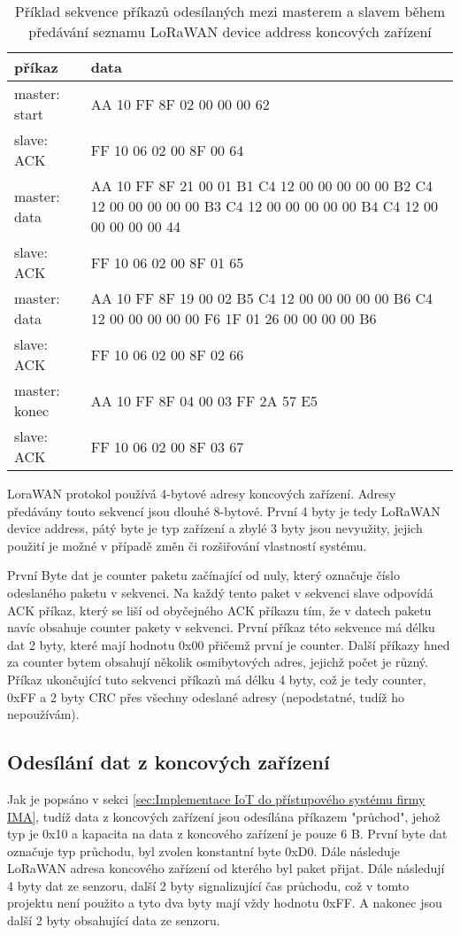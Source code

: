 \begin{table}[!h]
    \begin{tabular}{ |l|p{10cm}| }
    \hline
    příkaz      &  data    \\ \hline \hline
    master: start      &  AA 10 FF 8F 02 00 00 00 62    \\ \hline
    slave: ACK        &  FF 10 06 02 00 8F 00 64    \\ \hline
    master: data     &  AA 10 FF 8F 21 00 01 B1 C4 12 00 00 00 00 00 B2 C4 12 00 00 00 00 00 B3 C4 12 00 00 00 00 00 B4 C4 12 00 00 00 00 00 44 \\ \hline
    slave: ACK      &  FF 10 06 02 00 8F 01 65   \\ \hline
    master: data     &  AA 10 FF 8F 19 00 02 B5 C4 12 00 00 00 00 00 B6 C4 12 00 00 00 00 00 F6 1F 01 26 00 00 00 00 B6 \\ \hline
    slave: ACK      &   FF 10 06 02 00 8F 02 66   \\ \hline
    master: konec   &   AA 10 FF 8F 04 00 03 FF 2A 57 E5   \\ \hline
    slave: ACK      &   FF 10 06 02 00 8F 03 67  \\ \hline
    \end{tabular}
    \caption{Příklad sekvence příkazů odesílaných mezi masterem a slavem během předávání seznamu LoRaWAN device address koncových zařízení}
    \label{table:2}
\end{table}

LoraWAN protokol používá 4-bytové adresy koncových zařízení.
Adresy předávány touto sekvencí jsou dlouhé 8-bytové. První 4 byty je tedy LoRaWAN device address, pátý byte je typ zařízení a zbylé 3 byty jsou nevyužity, jejich použití je možné v případě změn či rozšiřování vlastností systému. 

První Byte dat je counter paketu začínající od nuly, který označuje číslo odeslaného paketu v sekvenci. Na každý tento paket v sekvenci slave odpovídá ACK příkaz, který se liší od obyčejného ACK příkazu tím, že v datech paketu navíc obsahuje counter pakety v sekvenci.
První příkaz této sekvence má délku dat 2 byty, které mají hodnotu 0x00 přičemž první je counter.
Další příkazy hned za counter bytem obsahují několik osmibytových adres, jejichž počet je různý.
Příkaz ukončující tuto sekvenci příkazů má délku 4 byty, což je tedy counter, 0xFF a 2 byty CRC přes všechny odeslané adresy (nepodstatné, tudíž ho nepoužívám).

\subsection{Odesílání dat z koncových zařízení}
\label{sec:Odesílání dat z koncových zařízení}
Jak je popsáno v sekci \ref{sec:Implementace IoT do přístupového systému firmy IMA}, tudíž data z koncových zařízení jsou odesílána příkazem "průchod", jehož typ je 0x10 a kapacita na data z koncového zařízení je pouze 6 B. 
První byte dat označuje typ průchodu, byl zvolen konstantní byte 0xD0. Dále následuje LoRaWAN adresa koncového zařízení od kterého byl paket přijat. Dále následují 4 byty dat ze senzoru, další 2 byty signalizující čas průchodu, což v tomto projektu není použito a tyto dva byty mají vždy hodnotu 0xFF. A nakonec jsou další 2 byty obsahující data ze senzoru.

